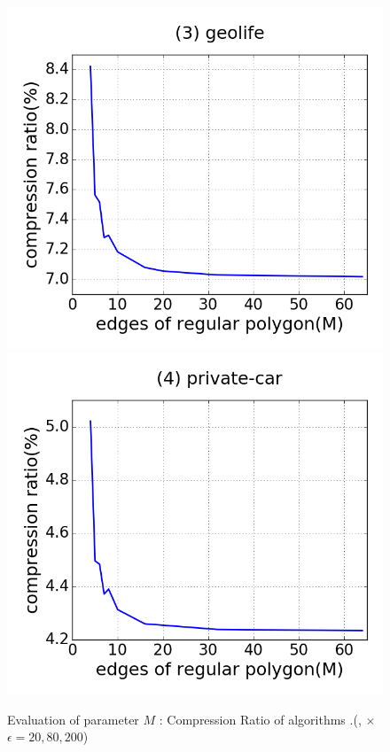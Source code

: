 {\begin{figure}[tb!]
\includegraphics[scale = 0.25]{figures/Exp-M-cr-geolife.png}
\includegraphics[scale = 0.25]{figures/Exp-M-cr-private.png}
\vspace{-2ex}
\caption{\small Evaluation of parameter $M$ : Compression Ratio of algorithms \cista.(\rpia, \cpia $\times$ $\epsilon = 20, 80, 200$)}
\label{fig:m-cr-cista}
\vspace{-1ex}
\end{figure}
}


